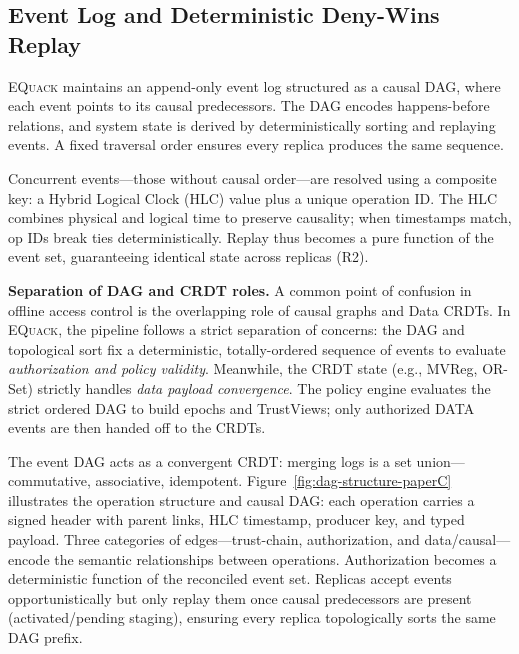 \documentclass[10pt,journal,compsoc]{IEEEtran}
\newcommand{\equack}{\textsc{EQuack}}
\begin{document}
%     

\subsection{Event Log and Deterministic Deny-Wins Replay}

\equack{} maintains an append-only event log structured as a causal DAG, where each event points to its causal predecessors. The DAG encodes happens-before relations, and system state is derived by deterministically sorting and replaying events. A fixed traversal order ensures every replica produces the same sequence.

Concurrent events---those without causal order---are resolved using a composite key: a Hybrid Logical Clock (HLC) value plus a unique operation ID. The HLC combines physical and logical time to preserve causality; when timestamps match, op IDs break ties deterministically. Replay thus becomes a pure function of the event set, guaranteeing identical state across replicas (R2). 

\textbf{Separation of DAG and CRDT roles.} A common point of confusion in offline access control is the overlapping role of causal graphs and Data CRDTs. In \equack{}, the pipeline follows a strict separation of concerns: the DAG and topological sort fix a deterministic, totally-ordered sequence of events to evaluate \textit{authorization and policy validity}. Meanwhile, the CRDT state (e.g., MVReg, OR-Set) strictly handles \textit{data payload convergence}. The policy engine evaluates the strict ordered DAG to build epochs and TrustViews; only authorized DATA events are then handed off to the CRDTs. 


The event DAG acts as a convergent CRDT: merging logs is a set union---commutative, associative, idempotent. Figure~\ref{fig:dag-structure-paperC} illustrates the operation structure and causal DAG: each operation carries a signed header with parent links, HLC timestamp, producer key, and typed payload. Three categories of edges---trust-chain, authorization, and data/causal---encode the semantic relationships between operations. Authorization becomes a deterministic function of the reconciled event set. Replicas accept events opportunistically but only replay them once causal predecessors are present (activated/pending staging), ensuring every replica topologically sorts the same DAG prefix.
\end{document}
